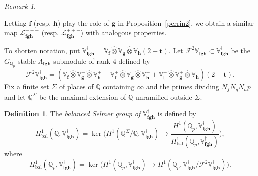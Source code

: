 \documentclass[a4paper,11pt]{amsart}
\theoremstyle{plain}
\theoremstyle{definition}
\newtheorem{definition}[theorem]{Definition}
\theoremstyle{remark}
\newtheorem{remarkwr}[theorem]{Remark}
\newenvironment{remark}{\begin{remarkwr}\begin{upshape}}{\end{upshape}\end{remarkwr}}
\newcommand{\bb}{\mathbb}
\newcommand{\cl}{\mathcal}
\DeclareMathOperator{\bal}{bal}
\newcommand{\hf}{{\mathbf{f}}}
\newcommand{\hg}{{\mathbf{g}}}
\newcommand{\hh}{{\mathbf h}}
\numberwithin{equation}{section}
\begin{document}
\begin{remark}
    Letting $\hf$ (resp. $\hh$) play the role of $\hg$ in Proposition~\ref{perrin2}, we obtain a similar map $\cl{L}_{\hf\hg\hh}^{-++}$ (resp. $\cl{L}_{\hf\hg\hh}^{++-}$) with analogous properties.
\end{remark}


To shorten notation, put $\bb{V}_{\hf\hg\hh}^\dagger=\bb{V}_\hf\hat{\otimes}\bb{V}_\hg\hat{\otimes}\bb{V}_\hh(2-\mathbf{t})$. Let $\mathscr{F}^2\mathbb V_{\hf\hg\hh}^\dag\subset \mathbb V_{\hf\hg\hh}^{\dag}$ be the $G_{\bb{Q}_p}$-stable $\Lambda_{\hf \hg \hh}$-submodule of rank $4$ defined by
\[
\mathscr{F}^2\mathbb V_{\hf\hg\hh}^\dag=(\bb{V}_\hf\hat{\otimes}\bb{V}_{\hg}^+\hat{\otimes}\bb{V}_{\hh}^+ +\bb{V}_\hf^+\hat{\otimes}\bb{V}_{\hg}\hat{\otimes}\bb{V}_{\hh}^+ +\bb{V}_\hf^+\hat{\otimes}\bb{V}_{\hg}^+\hat{\otimes}\bb{V}_{\hh})(2-\mathbf{t}).
\]
Fix a finite set $\Sigma$ of places of $\mathbb Q$ containing $\infty$ and the primes dividing $N_fN_gN_hp$ and let $\mathbb Q^\Sigma$ be the maximal extension of $\mathbb Q$ unramified outside $\Sigma$.











\begin{definition}\label{def:Sel2}
The \textit{balanced Selmer group of $\bb{V}_{\hf \hg \hh}^\dagger$} is defined by
\[
H^1_{\bal}(\bb{Q},\mathbb V_{\hf \hg \hh}^{\dag}) = \ker \bigg(
H^1(\mathbb Q^\Sigma/\mathbb Q, \mathbb V_{\hf \hg \hh}^{\dag}) \longrightarrow
\frac{H^1(\mathbb Q_p,\mathbb V_{\hf \hg \hh}^\dag)}{H^1_{\bal}(\bb{Q}_p,\mathbb V_{\hf \hg \hh}^\dag)}\bigg),
\]
where
\[
H^1_{\bal}(\bb{Q}_p,\mathbb V_{\hf \hg \hh}^\dag)=\ker \big(H^1(\mathbb Q_p, \mathbb V_{\hf \hg \hh}^{\dag}) \longrightarrow H^1(\mathbb Q_p, \mathbb V_{\hf \hg \hh}^{\dag}/\mathscr{F}^2\mathbb V_{\hf \hg \hh}^{\dag}) \big).
\]
\end{definition}
\end{document}

